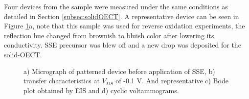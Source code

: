 Four devices from the sample were measured under the same conditions as detailed in Section \ref{subsec:solidOECT}. A representative device can be seen in Figure \ref{fig:dropcast}a, note that this sample was used for reverse oxidation experiments, the reflection hue changed from brownish to bluish color after lowering its conductivity. SSE precursor was blew off and a new drop was deposited for the solid-OECT. 

\begin{figure}[ht]
    \centering
	\hspace{3em}    
    \qquad
    \caption[Performance of solid-OECT with drop-casted SSE]{a) Micrograph of patterned device before application of SSE, b) transfer characteristics at $V_{DS}$ of -0.1 V. And representative c) Bode plot obtained by EIS and d) cyclic voltammograms.}
    \label{fig:dropcast}
\end{figure}

